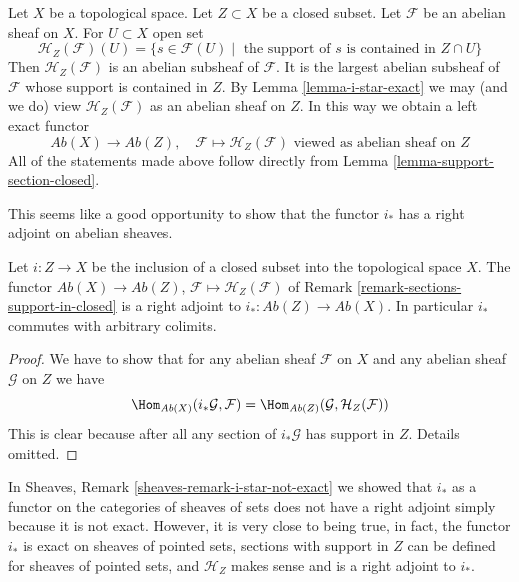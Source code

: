 \begin{remark}
\label{remark-sections-support-in-closed}
Let $X$ be a topological space. Let $Z \subset X$ be a closed subset.
Let $\mathcal{F}$ be an abelian sheaf on $X$. For $U \subset X$ open set
$$
\mathcal{H}_Z(\mathcal{F})(U) =
\{s \in \mathcal{F}(U) \mid
\text{ the support of }s\text{ is contained in }Z \cap U\}
$$
Then $\mathcal{H}_Z(\mathcal{F})$ is an abelian subsheaf of $\mathcal{F}$.
It is the largest abelian subsheaf of $\mathcal{F}$ whose support is
contained in $Z$. By Lemma \ref{lemma-i-star-exact} we may (and we do)
view $\mathcal{H}_Z(\mathcal{F})$ as an abelian sheaf on $Z$.
In this way we obtain a left exact functor
$$
\textit{Ab}(X) \longrightarrow \textit{Ab}(Z),\quad
\mathcal{F} \longmapsto \mathcal{H}_Z(\mathcal{F})
\text{ viewed as abelian sheaf on }Z
$$
All of the statements made above follow directly from
Lemma \ref{lemma-support-section-closed}.
\end{remark}

\noindent
This seems like a good opportunity to show that the functor
$i_*$ has a right adjoint on abelian sheaves.

\begin{lemma}
\label{lemma-i-star-right-adjoint}
Let $i : Z \to X$ be the inclusion of a closed subset into the
topological space $X$. The functor $\textit{Ab}(X) \to \textit{Ab}(Z)$,
$\mathcal{F} \mapsto \mathcal{H}_Z(\mathcal{F})$ of
Remark \ref{remark-sections-support-in-closed}
is a right adjoint to $i_* : \textit{Ab}(Z) \to \textit{Ab}(X)$.
In particular $i_*$ commutes with arbitrary colimits.
\end{lemma}

\begin{proof}
We have to show that for any abelian sheaf $\mathcal{F}$ on $X$ and any
abelian sheaf $\mathcal{G}$ on $Z$ we have
$$
\Hom_{\textit{Ab}(X)}(i_*\mathcal{G}, \mathcal{F}) =
\Hom_{\textit{Ab}(Z)}(\mathcal{G}, \mathcal{H}_Z(\mathcal{F}))
$$
This is clear because after all any section of $i_*\mathcal{G}$
has support in $Z$. Details omitted.
\end{proof}

\begin{remark}
\label{remark-i-star-right-adjoint}
In Sheaves, Remark \ref{sheaves-remark-i-star-not-exact}
we showed that $i_*$ as a functor
on the categories of sheaves of sets
does not have a right adjoint simply because
it is not exact. However, it is very close to being
true, in fact, the functor $i_*$ is exact on sheaves
of pointed sets, sections with support in $Z$ can
be defined for sheaves of pointed sets, and $\mathcal{H}_Z$
makes sense and is a right adjoint to $i_*$.
\end{remark}









